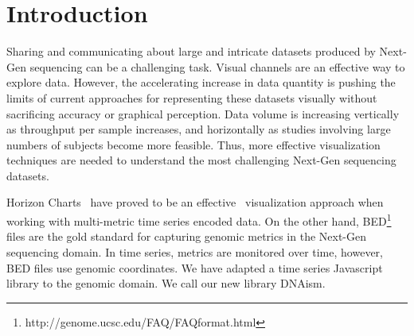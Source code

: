 \documentclass{bioinfo}
\begin{document}
\section{Introduction}

Sharing and communicating about large and intricate datasets produced by
Next-Gen sequencing can be a challenging task. Visual channels are an effective
way to explore data. However, the accelerating increase in data quantity is
pushing the limits of current approaches for representing these datasets
visually without sacrificing accuracy or graphical perception.  Data volume is
increasing vertically as throughput per sample increases, and horizontally as
studies involving large numbers of subjects become more feasible.  Thus, more
effective visualization techniques are needed to understand the most
challenging Next-Gen sequencing datasets.

Horizon Charts~\citep{time-in-the-horizon} have proved to be an 
effective~\citep{2009-horizon}
visualization approach when working with multi-metric time series 
encoded data.
On the other hand, BED\footnote{http://genome.ucsc.edu/FAQ/FAQformat.html}
files are the gold standard for capturing genomic metrics in the Next-Gen
sequencing domain. In time series, metrics are monitored over time, however,
BED files use genomic coordinates. We have adapted a time series Javascript
library to the genomic domain. We call our new library DNAism.
\end{document}
